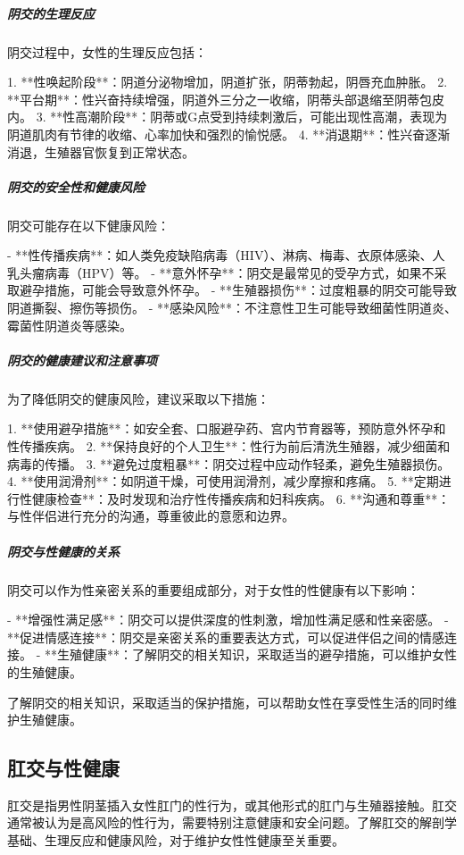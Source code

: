 \begin{enumerate}
\subparagraph{阴交的生理反应}

阴交过程中，女性的生理反应包括：

1. **性唤起阶段**：阴道分泌物增加，阴道扩张，阴蒂勃起，阴唇充血肿胀。
2. **平台期**：性兴奋持续增强，阴道外三分之一收缩，阴蒂头部退缩至阴蒂包皮内。
3. **性高潮阶段**：阴蒂或G点受到持续刺激后，可能出现性高潮，表现为阴道肌肉有节律的收缩、心率加快和强烈的愉悦感。
4. **消退期**：性兴奋逐渐消退，生殖器官恢复到正常状态。

\subparagraph{阴交的安全性和健康风险}

阴交可能存在以下健康风险：

- **性传播疾病**：如人类免疫缺陷病毒（HIV）、淋病、梅毒、衣原体感染、人乳头瘤病毒（HPV）等。
- **意外怀孕**：阴交是最常见的受孕方式，如果不采取避孕措施，可能会导致意外怀孕。
- **生殖器损伤**：过度粗暴的阴交可能导致阴道撕裂、擦伤等损伤。
- **感染风险**：不注意性卫生可能导致细菌性阴道炎、霉菌性阴道炎等感染。

\subparagraph{阴交的健康建议和注意事项}

为了降低阴交的健康风险，建议采取以下措施：

1. **使用避孕措施**：如安全套、口服避孕药、宫内节育器等，预防意外怀孕和性传播疾病。
2. **保持良好的个人卫生**：性行为前后清洗生殖器，减少细菌和病毒的传播。
3. **避免过度粗暴**：阴交过程中应动作轻柔，避免生殖器损伤。
4. **使用润滑剂**：如阴道干燥，可使用润滑剂，减少摩擦和疼痛。
5. **定期进行性健康检查**：及时发现和治疗性传播疾病和妇科疾病。
6. **沟通和尊重**：与性伴侣进行充分的沟通，尊重彼此的意愿和边界。

\subparagraph{阴交与性健康的关系}

阴交可以作为性亲密关系的重要组成部分，对于女性的性健康有以下影响：

- **增强性满足感**：阴交可以提供深度的性刺激，增加性满足感和性亲密感。
- **促进情感连接**：阴交是亲密关系的重要表达方式，可以促进伴侣之间的情感连接。
- **生殖健康**：了解阴交的相关知识，采取适当的避孕措施，可以维护女性的生殖健康。

了解阴交的相关知识，采取适当的保护措施，可以帮助女性在享受性生活的同时维护生殖健康。

\subsection{肛交与性健康}

肛交是指男性阴茎插入女性肛门的性行为，或其他形式的肛门与生殖器接触。肛交通常被认为是高风险的性行为，需要特别注意健康和安全问题。了解肛交的解剖学基础、生理反应和健康风险，对于维护女性性健康至关重要。


\end{enumerate}
